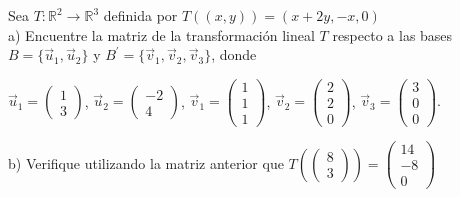 \begin{exercise}
\item
Sea $T:\mathbb{R}^2 \rightarrow \mathbb{R}^3$ definida por $T((x,y))=(x+2y,-x,0)$\\

 
a) 
Encuentre  la matriz de la transformación lineal $T$  respecto a las bases
 $B=\{\Vec{u}_1,\Vec{u}_2\}$ y $B^{\prime}=\{\Vec{v}_1,\Vec{v}_2,\Vec{v}_3\}$, donde

 \bigskip

$\Vec{u}_1=\left(\begin{array}{c}1\\3
\end{array}
 \right)$, $\Vec{u}_2=\left(\begin{array}{c}-2\\4
\end{array}
 \right)$, $\Vec{v}_1=\left(\begin{array}{c}1\\1\\1
\end{array}
 \right)$, $\Vec{v}_2=\left(\begin{array}{c}2\\2\\0
\end{array}
 \right)$, $\Vec{v}_3=\left(\begin{array}{c}3\\0\\0
\end{array}
 \right).$

\bigskip

 
b)
Verifique utilizando la matriz anterior que $T\left(\left(\begin{array}{c}8\\3
\end{array}
 \right)\right)=\left(\begin{array}{c}14\\-8\\0
\end{array}
 \right)$
\end{exercise}

